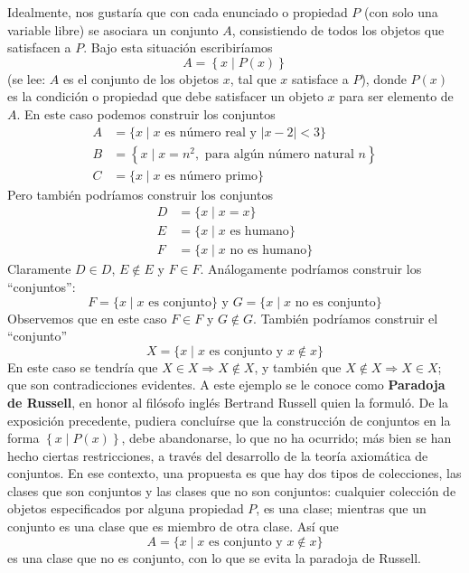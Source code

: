 Idealmente, nos gustaría que con cada enunciado o propiedad $P$ (con solo una variable libre) se asociara un conjunto $A$, consistiendo de todos los objetos que satisfacen a $P$. Bajo esta situación escribiríamos
$$A = \left\{x \mid P(x) \right\}$$
(se lee: $A$ es el conjunto de los objetos $x$, tal que $x$ satisface a $P$), donde $P(x)$ es la condición o propiedad que debe satisfacer un objeto $x$ para ser elemento de $A$. En este caso podemos construir los conjuntos
\begin{align*}
    A & = \{ x \mid x \text{ es número real y } |x-2|<3 \} \\
    B & = \left\{ x \mid x=n^2, \text{ para algún número natural } n \right\} \\
    C &=\{ x \mid x \text{ es número primo}\}
\end{align*}
Pero también podríamos construir los conjuntos
\begin{align*}
    D & =\{x \mid x=x\} \\ 
    E & =\{x \mid x \text { es humano}\} \\ 
    F & = \{x \mid x \text { no es humano}\}
\end{align*}
Claramente $D \in D$, $E \notin E$ y $F \in F$. Análogamente podríamos construir los ``conjuntos'':
$$F=\{x \mid x \text { es conjunto}\} \text { y } G=\{x \mid x \text { no es conjunto}\}$$
Observemos que en este caso $F \in F$ y $G \notin G$. También podríamos construir el ``conjunto''
$$X=\{x \mid x \text { es conjunto y } x \notin x\}$$ En este caso se tendría que $ X \in X \Longrightarrow X \notin X$, y también que $ X \notin X \Longrightarrow X \in X$; que son contradicciones evidentes. A este ejemplo se le conoce como \textbf{Paradoja de Russell}, en honor al filósofo inglés Bertrand Russell quien la formuló. De la exposición precedente, pudiera concluírse que la construcción de conjuntos en la forma $\left\{x \mid P(x) \right\}$, debe abandonarse, lo que no ha ocurrido; más bien se han hecho ciertas restricciones, a través del desarrollo de la teoría axiomática de conjuntos. En ese contexto, una propuesta es que hay dos tipos de colecciones, las clases que son conjuntos y las clases que no son conjuntos: cualquier colección de objetos especificados por alguna propiedad $P$, es una clase; mientras que un conjunto es una clase que es miembro de otra clase. Así que
$$A = \{x \mid x \text { es conjunto y } x \notin x\}$$
es una clase que no es conjunto, con lo que se evita la paradoja de Russell.\\


